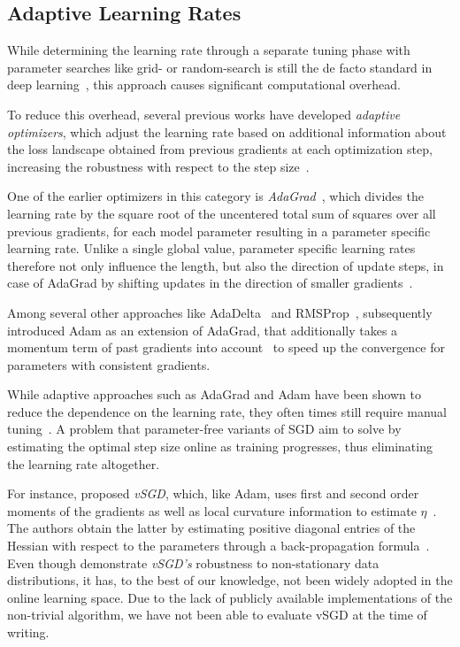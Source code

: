 \documentclass[letterpaper]{article} %
\begin{document}
\subsection{Adaptive Learning Rates}

While determining the learning rate through a separate tuning phase with parameter searches like grid- or random-search is still the de facto standard in deep learning~\cite{defazioLearningRateFreeLearningDAdaptation2023a}, this approach causes significant computational overhead.

To reduce this overhead, several previous works have developed \textit{adaptive optimizers}, which adjust the learning rate based on additional information about the loss landscape obtained from previous gradients at each optimization step, increasing the robustness with respect to the step size~\cite{duchiAdaptiveSubgradientMethods2011}.

One of the earlier optimizers in this category is \textit{AdaGrad}~\cite{duchiAdaptiveSubgradientMethods2011}, which divides the learning rate by the square root of the uncentered total sum of squares over all previous gradients, for each model parameter resulting in a parameter specific learning rate.
Unlike a single global value, parameter specific learning rates therefore not only influence the length, but also the direction of update steps, in case of AdaGrad by shifting updates in the direction of smaller gradients~\cite{wuWNGradLearnLearning2020}. %

Among several other approaches like AdaDelta~\cite[see e.g.]{zeilerADADELTAAdaptiveLearning2012a} and RMSProp~\cite{tielemanLecture5rmspropDivide2012}, \citet{kingmaAdamMethodStochastic2017b} subsequently introduced Adam as an extension of AdaGrad, that additionally takes a momentum term of past gradients into account~\cite[see]{sutskeverImportanceInitializationMomentum2013} to speed up the convergence for parameters with consistent gradients.

While adaptive approaches such as AdaGrad and Adam have been shown to reduce the dependence on the learning rate, they often times still require manual tuning~\cite{wuWNGradLearnLearning2020}.
A problem that parameter-free variants of SGD aim to solve by estimating the optimal step size online as training progresses, thus eliminating the learning rate altogether.

For instance, \citet{schaulNoMorePesky2013} proposed \textit{vSGD}, which, like Adam, uses first and second order moments of the gradients as well as local curvature information to estimate $\eta$~\cite{schaulNoMorePesky2013}.
The authors obtain the latter by estimating positive diagonal entries of the Hessian with respect to the parameters through a back-propagation formula~\cite{schaulNoMorePesky2013}.
Even though \citet{schaulNoMorePesky2013} demonstrate \textit{vSGD's} robustness to non-stationary data distributions, it has, to the best of our knowledge, not been widely adopted in the online learning space.
Due to the lack of publicly available implementations of the non-trivial algorithm, we have not been able to evaluate vSGD at the time of writing. 
\end{document}

